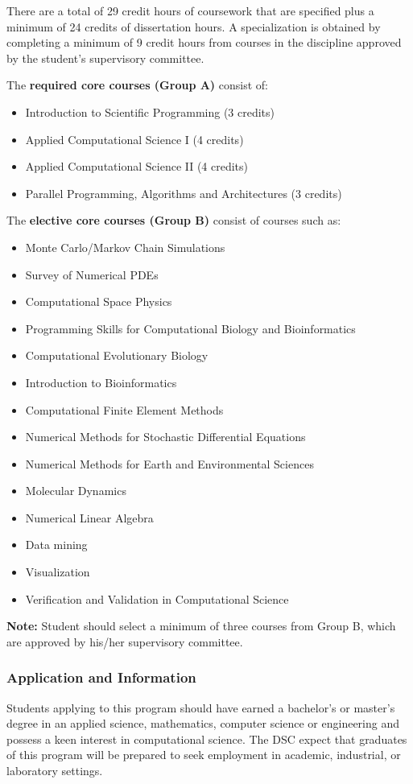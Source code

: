 \documentclass[12pt,a4paper]{article}
\begin{document}
There are a total of 29 credit hours of coursework that are specified plus a minimum of 24 credits of dissertation hours. A specialization is obtained by completing a minimum of 9 credit hours from courses in the discipline approved by the student's supervisory committee.

The \textbf{required core courses (Group A)} consist of:
\begin{itemize}
    \item Introduction to Scientific Programming (3 credits)
    \item Applied Computational Science I (4 credits)
    \item Applied Computational Science II (4 credits)
    \item Parallel Programming, Algorithms and Architectures (3 credits)
\end{itemize}

The \textbf{elective core courses (Group B)} consist of courses such as:
\begin{itemize}
    \item Monte Carlo/Markov Chain Simulations
    \item Survey of Numerical PDEs
    \item Computational Space Physics
    \item Programming Skills for Computational Biology and Bioinformatics
    \item Computational Evolutionary Biology
    \item Introduction to Bioinformatics
    \item Computational Finite Element Methods
    \item Numerical Methods for Stochastic Differential Equations
    \item Numerical Methods for Earth and Environmental Sciences
    \item Molecular Dynamics
    \item Numerical Linear Algebra
    \item Data mining
    \item Visualization
    \item Verification and Validation in Computational Science
\end{itemize}
\textbf{Note:} Student should select a minimum of three courses from Group B, which are approved by his/her supervisory committee.

\subsubsection*{Application and Information}
Students applying to this program should have earned a bachelor's or master's degree in an applied science, mathematics, computer science or engineering and possess a keen interest in computational science. The DSC expect that graduates of this program will be prepared to seek employment in academic, industrial, or laboratory settings.
\end{document}
